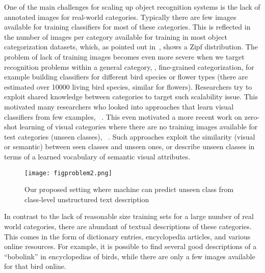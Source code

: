
One of the main challenges for scaling up object recognition systems is the lack of annotated images for real-world categories. 
Typically there are few images available for training classifiers for most of these categories. This is reflected in the number of images per category available for training in most object categorization datasets, which, as pointed out in~\cite{Salakhutdinov11}, shows a Zipf distribution. 
The problem of lack of training images becomes even more severe when we target recognition problems within a general category, \ie, fine-grained categorization, for example building classifiers for different bird species or flower types  (there are estimated over 10000 living bird species, similar for flowers). 
Researchers try to exploit shared knowledge between categories to target such scalability issue.
This motivated many researchers who looked into approaches that learn visual classifiers from few examples, \eg~\cite{deng2010does,fe2003bayesian,BartU05}.   This even motivated a more recent work on zero-shot learning of visual categories where there are no training images available for test categories (unseen classes), \eg~\cite{Lampert09}. Such approaches exploit the similarity (visual or semantic) between seen classes and unseen ones, or describe unseen classes in terms of a learned vocabulary of semantic visual attributes. 


  \begin{figure}[t!]
\centering
\vspace{-3mm}
    \texttt{[image: figproblem2.png]} 
      \vspace{-2mm}
  \caption{{Our proposed setting where machine can predict unseen class from class-level unstructured  text description}}
  \label{fig:problem}
    \vspace{-6mm}
\end{figure}

In contrast to the lack of reasonable size training sets for a large number of real world categories, there are abundant of textual descriptions of these categories. This comes in the form of dictionary entries, encyclopedia articles, and various online resources. For example, it is possible to find several good descriptions of a ``bobolink'' in encyclopedias of birds, while there are only a few images available for that bird online. 

